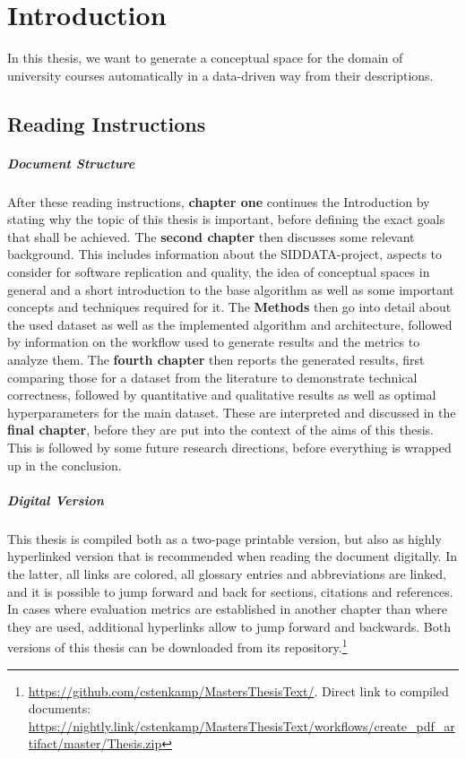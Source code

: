 \chapter{Introduction}

In this thesis, we want to generate a conceptual space for the domain of university courses automatically in a data-driven way from their descriptions.

\section{Reading Instructions}

\paragraph*{Document Structure}

After these reading instructions, \textbf{chapter one} continues the Introduction by stating why the topic of this thesis is important, before defining the exact goals that shall be achieved. The \textbf{second chapter} then discusses some relevant background. This includes information about the SIDDATA-project, aspects to consider for software replication and quality, the idea of conceptual spaces in general and a short introduction to the base algorithm as well as some important concepts and techniques required for it. The \textbf{Methods} then go into detail about the used dataset as well as the implemented algorithm and architecture, followed by information on the workflow used to generate results and the metrics to analyze them. The \textbf{fourth chapter} then reports the generated results, first comparing those for a dataset from the literature to demonstrate technical correctness, followed by quantitative and qualitative results as well as optimal hyperparameters for the main dataset. These are interpreted and discussed in the \textbf{final chapter}, before they are put into the context of the aims of this thesis. This is followed by some future research directions, before everything is wrapped up in the conclusion.

\paragraph*{Digital Version}

This thesis is compiled both as a two-page printable version, but also as highly hyperlinked version that is recommended when reading the document digitally. In the latter, all links are colored, all glossary entries and abbreviations are linked, and it is possible to jump forward and back for sections, citations and references. In cases where \eg evaluation metrics are established in another chapter than where they are used, additional hyperlinks allow to jump forward and backwards. Both versions of this thesis can be downloaded from its repository.\footnote{\url{https://github.com/cstenkamp/MastersThesisText/}. Direct link to compiled documents: \url{https://nightly.link/cstenkamp/MastersThesisText/workflows/create_pdf_artifact/master/Thesis.zip}}

